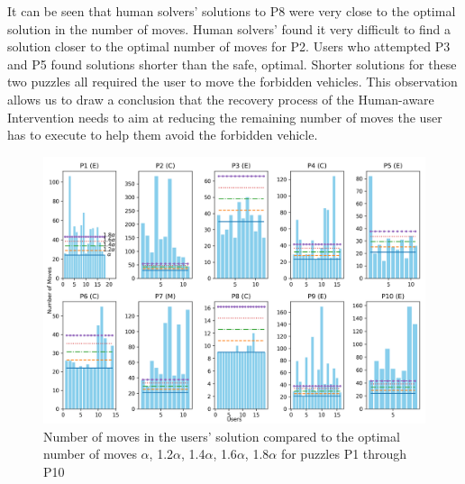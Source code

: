 It can be seen that human solvers' solutions to P8 were very close to the optimal solution in the number of moves. 
Human solvers' found it very difficult to find a solution closer to the optimal number of moves for P2.
Users who attempted P3 and P5 found solutions shorter than the safe, optimal. 
Shorter solutions for these two puzzles all required the user to move the forbidden vehicles.
This observation allows us to draw a conclusion that the recovery process of the Human-aware Intervention needs to aim at reducing the remaining number of moves the user has to execute to help them avoid the forbidden vehicle.

\begin{figure}[tpb]
  \centering
\includegraphics[width=\columnwidth]{img/figure7.jpg}
  \caption{Number of moves in the users' solution compared to the optimal number of moves $\alpha$, 1.2$\alpha$, 1.4$\alpha$, 1.6$\alpha$, 1.8$\alpha$ for puzzles P1 through P10}
  \label{fig:difficulty}
\end{figure}

